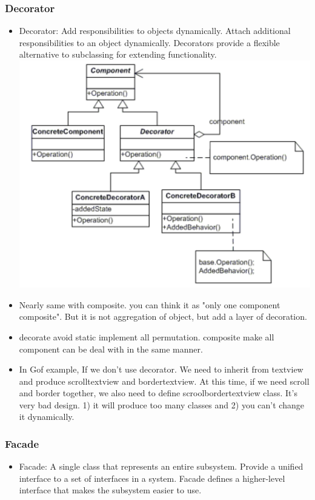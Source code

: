 \documentclass[a4paper,12pt,twoside]{book}
\begin{document}
\subsubsection{Decorator}
\begin{itemize}
\item Decorator: Add responsibilities to objects dynamically.  Attach additional responsibilities to an object dynamically. Decorators provide a flexible alternative to subclassing for extending functionality.
\includegraphics[scale=0.75]{pics/decorator.png}

\item Nearly same with composite. you can think it as "only one component composite".  But it is not aggregation of object, but add a layer of decoration. 

\item decorate avoid static implement all permutation. composite make all component can be deal with in the same manner. 

\item In Gof example, If we don't use decorator. We need to inherit from textview and produce scrolltextview and bordertextview. At this time, if we need scroll and border together, we also need to define scroolbordertextview class. It's very bad design. 1) it will produce too many classes and 2) you can't change it dynamically. 


\end{itemize}

\subsubsection{Facade}
\begin{itemize}
\item Facade: A single class that represents an entire subsystem. Provide a unified interface to a set of interfaces in a system. Facade defines a higher-level interface that makes the subsystem easier to use.

\end{itemize}
\end{document}
